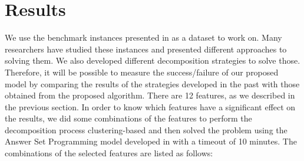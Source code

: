 \documentclass[runningheads]{llncs}
\begin{document}
\section{Results}
\label{sec:eval}
We use the benchmark instances presented in \cite{taillard1993benchmarks} as a dataset to work on. Many researchers have studied these instances and presented different approaches to solving them. We also developed different decomposition strategies to solve those. Therefore, it will be possible to measure the success/failure of our proposed model by comparing the results of the strategies developed in the past with those obtained from the proposed algorithm. There are 12 features, as we described in the previous section. In order to know which features have a significant effect on the results, we did some combinations of the features to perform the decomposition process clustering-based and then solved the problem using the Answer Set Programming model developed in \cite{el2020job} with a timeout of 10 minutes. The combinations of the selected features are listed as follows:
\end{document}
